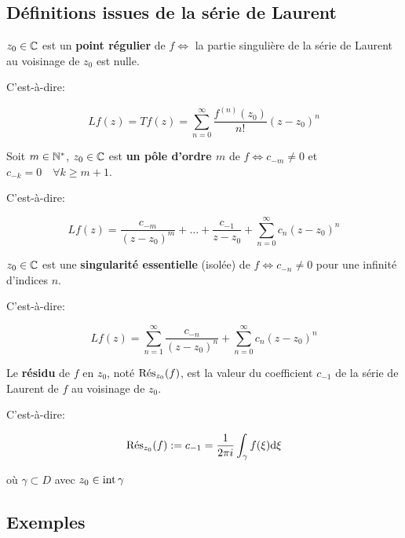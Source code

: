 \subsection{Définitions issues de la série de Laurent}

\begin{definition}[1]
    $z_0 \in \Cx$ est un \textbf{point régulier} de $f \iff$ la partie singulière de la série de Laurent au voisinage de $z_0$ est nulle.
    
    C'est-à-dire:
    
    \[ Lf(z) = Tf(z) = \sum_{n = 0}^{\infty} \frac{f^{(n)}(z_0)}{n!} (z - z_0)^n \]
\end{definition}

\begin{definition}[2]
    Soit $m \in \N^\ast$, $z_0 \in \Cx$ est \textbf{un pôle d'ordre $m$} de $f \iff c_{-m} \neq 0$ et $c_{-k} = 0 \quad \forall k \geq m + 1$.
    
    C'est-à-dire:
    
    \[ Lf(z) = \frac{c_{-m}}{(z-z_0)^m} + \ldots + \frac{c_{-1}}{z-z_0} + \sum_{n = 0}^{\infty} c_n(z - z_0)^n \]
\end{definition}

\begin{definition}[3]
    $z_0 \in \Cx$ est une \textbf{singularité essentielle} (isolée) de $f \iff c_{-n} \neq 0$ pour une infinité d'indices $n$.
    
    C'est-à-dire:
    
    \[ Lf(z) = \sum_{n = 1}^{\infty} \frac{c_{-n}}{(z - z_0)^{n}} + \sum_{n = 0}^{\infty} c_n(z - z_0)^n \]
\end{definition}

\begin{definition}[4]
    Le \textbf{résidu} de $f$ en $z_0$, noté $\Res_{z_0}(f)$, est la valeur du coefficient $c_{-1}$ de la série de Laurent de $f$ au voisinage de $z_0$.
    
    C'est-à-dire:
    
    \[ \Res_{z_0}(f) := c_{-1} = \oipi \int_\gamma f(\xi) \dxi \]
    
    où $\gamma \subset D$ avec $z_0 \in \inte \gamma$
\end{definition}

\subsection{Exemples}

